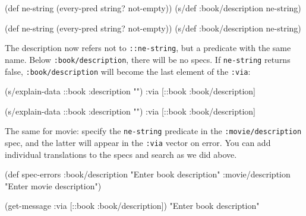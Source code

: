 \ifx\DEVICETYPE\MOBILE

\begin{english}
  \begin{clojure}
(def ne-string
  (every-pred string? not-empty))
(s/def :book/description ne-string)
  \end{clojure}
\end{english}

\else

\begin{english}
  \begin{clojure}
(def ne-string (every-pred string? not-empty))
(s/def :book/description ne-string)
  \end{clojure}
\end{english}

\fi

The description now refers not to \verb|::ne-string|, but a predicate with the same name. Below \verb|:book/description|, there will be no specs. If \verb|ne-string| returns false, \verb|:book/description| will become the last element of the \verb|:via|:

\ifx\DEVICETYPE\MOBILE

\begin{english}
  \begin{clojure}
(s/explain-data ::book
  {:description ""})
{:via [::book :book/description]}
  \end{clojure}
\end{english}

\else

\begin{english}
  \begin{clojure}
(s/explain-data ::book {:description ""})
{:via [::book :book/description]}
  \end{clojure}
\end{english}

\fi

The same for movie: specify the \verb|ne-string| predicate in the \verb|:movie/description| spec, and the latter will appear in the \verb|:via| vector on error. You can add individual translations to the specs and search as we did above.

\ifx\DEVICETYPE\MOBILE

 \begin{clojure}
(def spec-errors
  {:book/description
   "Enter book description"
   :movie/description
   "Enter movie description"})

(get-message
  {:via [::book :book/description]})
"Enter book description"
  \end{clojure}

